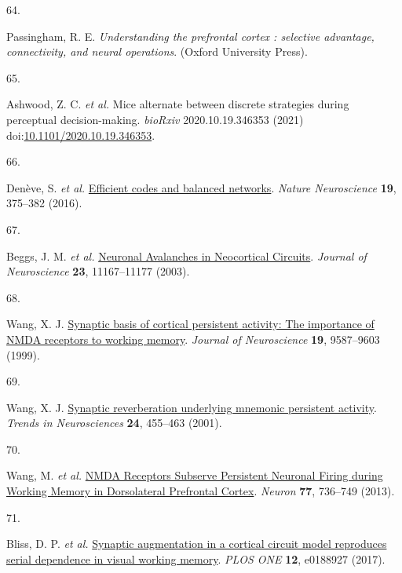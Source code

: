 \documentclass[
]{article}
\newlength{\cslhangindent}
\newlength{\csllabelwidth}
\newlength{\cslentryspacingunit} %
\newenvironment{CSLReferences}[2] %
 {%
  \setlength{\parindent}{0pt}
  \ifodd #1
  \let\oldpar\par
  \def\par{\hangindent=\cslhangindent\oldpar}
  \fi
  \setlength{\parskip}{#2\cslentryspacingunit}
 }%
 {}
\newcommand{\CSLLeftMargin}[1]{\parbox[t]{\csllabelwidth}{#1}}
\newcommand{\CSLRightInline}[1]{\parbox[t]{\linewidth - \csllabelwidth}{#1}\break}
\begin{document}
\begin{CSLReferences}{0}{0}
\leavevmode{}%
\CSLLeftMargin{64. }%
\CSLRightInline{Passingham, R. E. \emph{{Understanding the prefrontal
cortex : selective advantage, connectivity, and neural operations}}.
(Oxford University Press).}

\leavevmode{}%
\CSLLeftMargin{65. }%
\CSLRightInline{Ashwood, Z. C. \emph{et al.} {Mice alternate between
discrete strategies during perceptual decision-making}. \emph{bioRxiv}
2020.10.19.346353 (2021)
doi:\href{https://doi.org/10.1101/2020.10.19.346353}{10.1101/2020.10.19.346353}.}

\leavevmode{}%
\CSLLeftMargin{66. }%
\CSLRightInline{Denève, S. \emph{et al.}
\href{https://doi.org/10.1038/nn.4243}{{Efficient codes and balanced
networks}}. \emph{Nature Neuroscience} \textbf{19}, 375--382 (2016).}

\leavevmode{}%
\CSLLeftMargin{67. }%
\CSLRightInline{Beggs, J. M. \emph{et al.}
\href{https://doi.org/10.1523/jneurosci.23-35-11167.2003}{{Neuronal
Avalanches in Neocortical Circuits}}. \emph{Journal of Neuroscience}
\textbf{23}, 11167--11177 (2003).}

\leavevmode{}%
\CSLLeftMargin{68. }%
\CSLRightInline{Wang, X. J.
\href{https://doi.org/10.1523/jneurosci.19-21-09587.1999}{{Synaptic
basis of cortical persistent activity: The importance of NMDA receptors
to working memory}}. \emph{Journal of Neuroscience} \textbf{19},
9587--9603 (1999).}

\leavevmode{}%
\CSLLeftMargin{69. }%
\CSLRightInline{Wang, X. J.
\href{https://doi.org/10.1016/S0166-2236(00)01868-3}{{Synaptic
reverberation underlying mnemonic persistent activity}}. \emph{Trends in
Neurosciences} \textbf{24}, 455--463 (2001).}

\leavevmode{}%
\CSLLeftMargin{70. }%
\CSLRightInline{Wang, M. \emph{et al.}
\href{https://doi.org/10.1016/j.neuron.2012.12.032}{{NMDA Receptors
Subserve Persistent Neuronal Firing during Working Memory in
Dorsolateral Prefrontal Cortex}}. \emph{Neuron} \textbf{77}, 736--749
(2013).}

\leavevmode{}%
\CSLLeftMargin{71. }%
\CSLRightInline{Bliss, D. P. \emph{et al.}
\href{https://doi.org/10.1371/journal.pone.0188927}{{Synaptic
augmentation in a cortical circuit model reproduces serial dependence in
visual working memory}}. \emph{PLOS ONE} \textbf{12}, e0188927 (2017).}


\end{CSLReferences}
\end{document}
